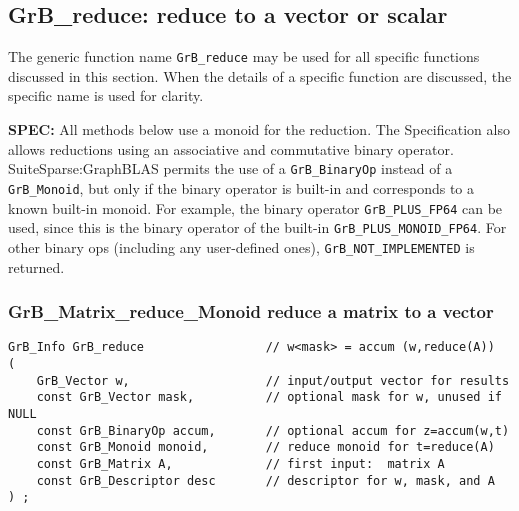 \documentclass[12pt]{article}
\begin{document}
\newpage
\subsection{{\sf GrB\_reduce:} reduce to a vector or scalar} %
\label{reduce}

The generic function name \verb'GrB_reduce' may be used for all specific
functions discussed in this section.  When the details of a specific function
are discussed, the specific name is used for clarity.

\begin{alert}
{\bf SPEC:} 
All methods below use a monoid for the reduction.  The Specification also
allows reductions using an associative and commutative binary operator.
SuiteSparse:GraphBLAS permits the use of a \verb'GrB_BinaryOp' instead of a
\verb'GrB_Monoid', but only if the binary operator is built-in and corresponds
to a known built-in monoid.  For example, the binary operator
\verb'GrB_PLUS_FP64' can be used, since this is the binary operator of the
built-in \verb'GrB_PLUS_MONOID_FP64'.  For other binary ops (including any
user-defined ones), \verb'GrB_NOT_IMPLEMENTED' is returned.

\end{alert}

\subsubsection{{\sf GrB\_Matrix\_reduce\_Monoid} reduce a matrix to a vector}
\label{reduce_to_vector}

\begin{mdframed}[userdefinedwidth=6in]
{\footnotesize
\begin{verbatim}
GrB_Info GrB_reduce                 // w<mask> = accum (w,reduce(A))
(
    GrB_Vector w,                   // input/output vector for results
    const GrB_Vector mask,          // optional mask for w, unused if NULL
    const GrB_BinaryOp accum,       // optional accum for z=accum(w,t)
    const GrB_Monoid monoid,        // reduce monoid for t=reduce(A)
    const GrB_Matrix A,             // first input:  matrix A
    const GrB_Descriptor desc       // descriptor for w, mask, and A
) ;
\end{verbatim} } \end{mdframed}
\end{document}
